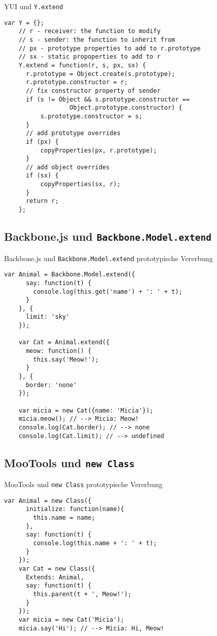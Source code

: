 \begin{frame}[fragile]{YUI und \texttt{Y.extend}}
  \begin{lstlisting}[gobble=4]
    var Y = {};    
    // r - receiver: the function to modify
    // s - sender: the function to inherit from
    // px - prototype properties to add to r.prototype
    // sx - static propoperties to add to r
    Y.extend = function(r, s, px, sx) {
      r.prototype = Object.create(s.prototype);
      r.prototype.constructor = r;
      // fix constructor property of sender
      if (s != Object && s.prototype.constructor ==
                  Object.prototype.constructor) {
          s.prototype.constructor = s;
      }
      // add prototype overrides
      if (px) {
          copyProperties(px, r.prototype);
      }
      // add object overrides
      if (sx) {
          copyProperties(sx, r);
      }
      return r;
    };
  \end{lstlisting}
\end{frame}

\subsection{Backbone.js und \texttt{Backbone.Model.extend}}

\begin{frame}[fragile]{Backbone.js und \texttt{Backbone.Model.extend}}
    {prototypische Vererbung}
  \begin{lstlisting}[gobble=4]
    var Animal = Backbone.Model.extend({
      say: function(t) {
        console.log(this.get('name') + ': ' + t);
      }
    }, {
      limit: 'sky'
    });
    
    var Cat = Animal.extend({
      meow: function() {
        this.say('Meow!');
      }
    }, {
      border: 'none'
    });
    
    var micia = new Cat({name: 'Micia'});
    micia.meow(); // --> Micia: Meow!
    console.log(Cat.border); // --> none
    console.log(Cat.limit); // --> undefined
  \end{lstlisting}
\end{frame}

\subsection{MooTools und \texttt{new Class}}

\begin{frame}[fragile]{MooTools und \texttt{new Class}}
    {prototypische Vererbung}
  \begin{lstlisting}[gobble=4]
    var Animal = new Class({
      initialize: function(name){
        this.name = name;
      },
      say: function(t) {
        console.log(this.name + ': ' + t);
      }
    });
    var Cat = new Class({
      Extends: Animal,
      say: function(t) {
        this.parent(t + ', Meow!');
      }
    });
    var micia = new Cat('Micia');
    micia.say('Hi'); // --> Micia: Hi, Meow!
  \end{lstlisting}
\end{frame}

